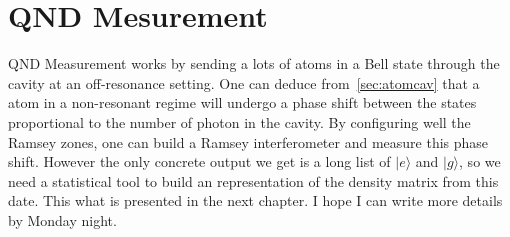 \documentclass[10pt,a4paper]{report}
\theoremstyle{plain}
\theoremstyle{definition}
\theoremstyle{remark}
\newcommand{\TODO}{\textbf{TODO}}
\newcommand{\ket}[1]{|#1\rangle}
\begin{document}


















\section{QND Mesurement}


QND Measurement works by sending a lots of atoms in a Bell state through the
cavity at an off-resonance setting. One can deduce from~\cref{sec:atomcav} that
a atom in a non-resonant regime will undergo a phase shift between the states
proportional to the number of photon in the cavity. By configuring well the
Ramsey zones, one can build a Ramsey interferometer and measure this phase
shift. However the only concrete output we get is a long list of $\ket e$ and
$\ket g$, so we need a statistical tool to build an representation of the
density matrix from this date. This what is presented in the next chapter. I
hope I can write more details by Monday night.
\end{document}
